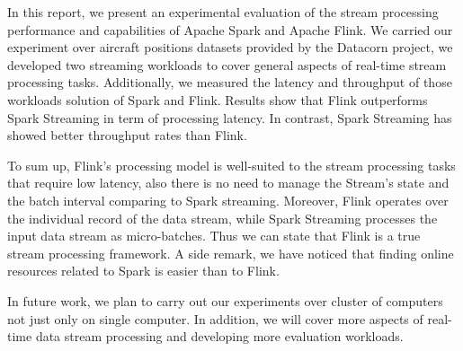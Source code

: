 \documentclass[]{article}
\begin{document}
\label{sec:sec5}
In this report, we present an experimental evaluation of the stream processing performance and capabilities of Apache Spark and Apache Flink. We carried our experiment over aircraft positions datasets provided by the Datacorn project, we developed two streaming workloads to cover general aspects of real-time stream processing tasks. Additionally,  we measured the latency and throughput of those workloads solution of Spark and Flink. Results show that Flink outperforms Spark Streaming in term of processing latency. In contrast, Spark Streaming has showed better throughput rates than Flink. 
\par To sum up, Flink's processing model is well-suited to the stream processing tasks that require low latency, also there is no need to manage the Stream's state and the batch interval comparing to Spark streaming. Moreover, Flink operates over the individual record of the data stream, while Spark Streaming  processes the input data stream as micro-batches. Thus we can state that  Flink is a true stream processing framework. A side remark, we have  noticed that finding online resources related to Spark is easier than to Flink.

In future work, we plan to carry out our experiments over cluster of computers not just only on single computer. In addition, we will cover more aspects of real-time data stream processing and developing more evaluation workloads. 
\end{document}
